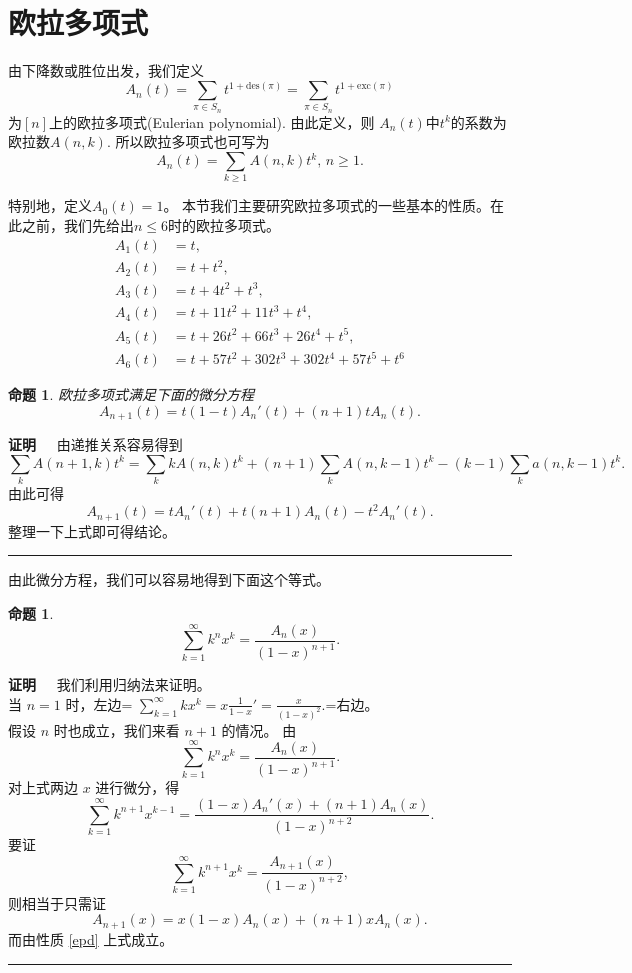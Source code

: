 \documentclass[a4paper,11pt]{article}
\newtheorem{prop}[thm]{命题}
\def\qed{\nopagebreak\hfill{\rule{4pt}{7pt}}\medbreak}
\def\pf{{\bf 证明~~ }}
\def \des{\mathrm{des}}
\def \exc{\mathrm{exc}}
\begin{document}
\section{欧拉多项式}
由下降数或胜位出发，我们定义
$$A_n(t)=\sum_{\pi\in S_n}t^{1+\des(\pi)}=
\sum_{\pi\in S_n}t^{1+\exc(\pi)}$$ 为$[n]$上的欧拉多项式(Eulerian
polynomial). 由此定义，则 $A_n(t)$中$t^{k}$的系数为欧拉数$A(n,k)$.
所以欧拉多项式也可写为 \[A_n(t)=\sum_{k\geq 1}A(n,k)t^k,\,n\geq1.\]

特别地，定义$A_0(t)=1$。
本节我们主要研究欧拉多项式的一些基本的性质。在此之前，我们先给出$n\leq
6$时的欧拉多项式。
\begin{align*}
A_1(t) &=t, \\[5pt]
A_2(t) &=t+t^2, \\[5pt]
A_3(t) &=t+4t^2+t^3, \\[5pt]
A_4(t) &=t+11t^2+11t^3+t^4,\\[5pt]
A_5(t) &=t+26t^2+66t^3+26t^4+t^5, \\[5pt]
A_6(t) &=t+57t^2+302t^3+302t^4+57t^5+t^6
\end{align*}

\begin{prop}\label{epd}
欧拉多项式满足下面的微分方程
\begin{equation}
A_{n+1}(t)=t(1-t)A_n'(t)+(n+1)tA_n(t).
\end{equation}
\end{prop}
\pf 由递推关系容易得到
\[
\sum_{k}A(n+1,k)t^k=\sum_{k}kA(n,k)t^k+(n+1)\sum_kA(n,k-1)t^k-(k-1)\sum_{k}a(n,k-1)t^k.\]
由此可得
\[A_{n+1}(t)=tA_n'(t)+t(n+1)A_n(t)-t^2A_n'(t).\]
整理一下上式即可得结论。\qed


由此微分方程，我们可以容易地得到下面这个等式。

\begin{prop}\label{pELdxs}
\begin{equation}
\sum\limits^{\infty}_{k=1}k^nx^k=\frac{A_n(x)}{(1-x)^{n+1}}.
\end{equation}
\end{prop}
\pf 我们利用归纳法来证明。\\
当 $n=1$ 时，左边=
$\sum\limits^{\infty}_{k=1}kx^k=x\frac{1}{1-x}'=\frac{x}{(1-x)^2}.$=右边。\\
假设 $n$ 时也成立，我们来看 $n+1$ 的情况。 由
\[  \sum\limits^{\infty}_{k=1}k^nx^k=\frac{A_n(x)}{(1-x)^{n+1}}.   \]
对上式两边 $x$ 进行微分，得
\[
\sum\limits^{\infty}_{k=1}k^{n+1}x^{k-1}=\frac{(1-x)A_n'(x)+(n+1)A_n(x)}{(1-x)^{n+2}}.\]
要证　\[
\sum\limits^{\infty}_{k=1}k^{n+1}x^k=\frac{A_{n+1}(x)}{(1-x)^{n+2}},\]
则相当于只需证
\[A_{n+1}(x)=x(1-x)A_n(x)+(n+1)xA_n(x).\]
而由性质 \eqref{epd} 上式成立。　\qed
\end{document}
